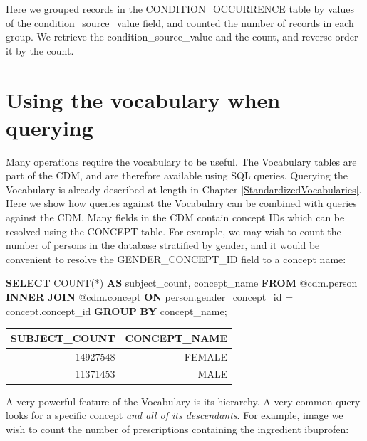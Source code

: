 \documentclass[11pt]{book}
\newenvironment{Shaded}{\begin{snugshade}}{\end{snugshade}}
\newcommand{\KeywordTok}[1]{\textcolor[rgb]{0.13,0.29,0.53}{\textbf{#1}}}
\newcommand{\FunctionTok}[1]{\textcolor[rgb]{0.00,0.00,0.00}{#1}}
\newcommand{\NormalTok}[1]{#1}
\begin{document}
Here we grouped records in the CONDITION\_OCCURRENCE table by values of
the condition\_source\_value field, and counted the number of records in
each group. We retrieve the condition\_source\_value and the count, and
reverse-order it by the count.

\section{Using the vocabulary when
querying}\label{using-the-vocabulary-when-querying}

Many operations require the vocabulary to be useful. The Vocabulary
tables are part of the CDM, and are therefore available using SQL
queries. Querying the Vocabulary is already described at length in
Chapter \ref{StandardizedVocabularies}. Here we show how queries against
the Vocabulary can be combined with queries against the CDM. Many fields
in the CDM contain concept IDs which can be resolved using the CONCEPT
table. For example, we may wish to count the number of persons in the
database stratified by gender, and it would be convenient to resolve the
GENDER\_CONCEPT\_ID field to a concept name:

\begin{Shaded}
\begin{Highlighting}[]
\KeywordTok{SELECT} \FunctionTok{COUNT}\NormalTok{(*) }\KeywordTok{AS}\NormalTok{ subject_count,}
\NormalTok{  concept_name}
\KeywordTok{FROM}\NormalTok{ @cdm.person}
\KeywordTok{INNER} \KeywordTok{JOIN}\NormalTok{ @cdm.concept}
  \KeywordTok{ON}\NormalTok{ person.gender_concept_id = concept.concept_id}
\KeywordTok{GROUP} \KeywordTok{BY}\NormalTok{ concept_name;}
\end{Highlighting}
\end{Shaded}

\begin{longtable}[]{@{}rr@{}}
\toprule
SUBJECT\_COUNT & CONCEPT\_NAME\tabularnewline
\midrule
\endhead
14927548 & FEMALE\tabularnewline
11371453 & MALE\tabularnewline
\bottomrule
\end{longtable}

A very powerful feature of the Vocabulary is its hierarchy. A very
common query looks for a specific concept \emph{and all of its
descendants}. For example, image we wish to count the number of
prescriptions containing the ingredient ibuprofen:
\end{document}
